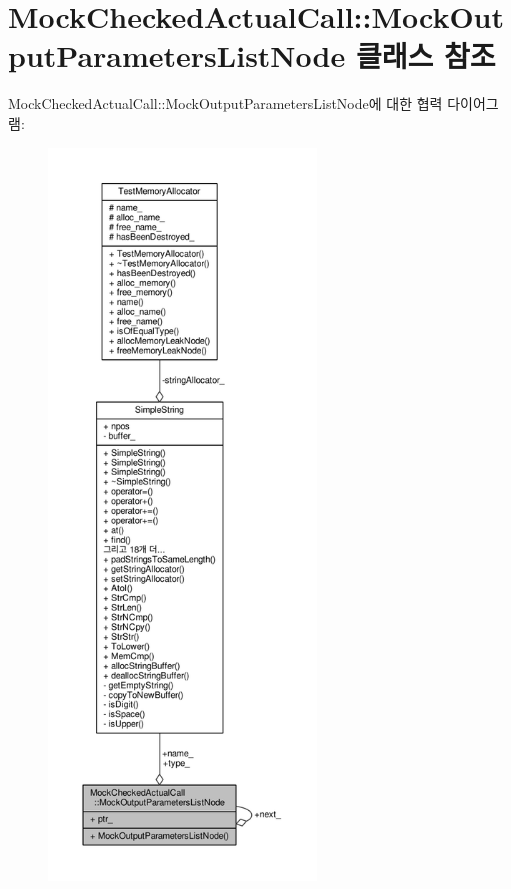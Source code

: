 \hypertarget{class_mock_checked_actual_call_1_1_mock_output_parameters_list_node}{}\section{Mock\+Checked\+Actual\+Call\+:\+:Mock\+Output\+Parameters\+List\+Node 클래스 참조}
\label{class_mock_checked_actual_call_1_1_mock_output_parameters_list_node}


Mock\+Checked\+Actual\+Call\+:\+:Mock\+Output\+Parameters\+List\+Node에 대한 협력 다이어그램\+:
\nopagebreak
\begin{figure}[H]
\begin{center}
\leavevmode
\includegraphics[height=550pt]{class_mock_checked_actual_call_1_1_mock_output_parameters_list_node__coll__graph}
\end{center}
\end{figure}
